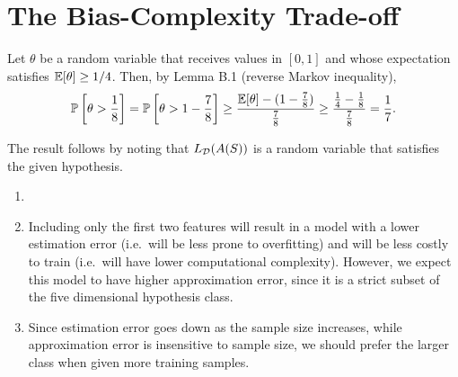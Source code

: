 \chapter{The Bias-Complexity Trade-off}

\begin{ex}
  Let $\theta$ be a random variable that receives values in $[0, 1]$ and whose
  expectation satisfies $\mathbb{E}[\theta] \geq 1/4$. Then, by Lemma B.1
  (reverse Markov inequality),
  \begin{align*}
    \mathbb{P}\left[\theta > \frac{1}{8}\right]
    = \mathbb{P}\left[\theta > 1-\frac{7}{8}\right]
    \geq \frac{\mathbb{E}[\theta]-(1-\frac{7}{8})}{\frac{7}{8}}
    \geq \frac{\frac{1}{4}-\frac{1}{8}}{\frac{7}{8}}
    =\frac{1}{7}.
  \end{align*}

  The result follows by noting that $L_{\mathcal{D}}(A(S))$ is a random variable that
  satisfies the given hypothesis.
\end{ex}

\begin{ex}
  \begin{enumerate}
    \item[]
    \item Including only the first two features will result in a model with
          a lower estimation error (i.e.\ will be less prone to overfitting) and
          will be less costly to train (i.e.\ will have lower computational
          complexity). However, we expect this model to have higher
          approximation error, since it is a strict subset of the five
          dimensional hypothesis class.
    \item Since estimation error goes down as the sample size increases, while
          approximation error is insensitive to sample size, we should prefer
          the larger class when given more training samples.
  \end{enumerate}
\end{ex}

\begin{ex}
\end{ex}
